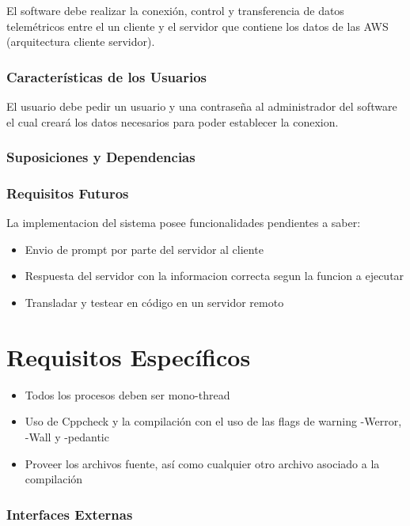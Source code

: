 \documentclass[10pt, a4paper,notitlepage]{article}
\begin{document}
El software debe realizar la conexión, control y transferencia de datos telemétricos entre el un cliente y el servidor que contiene los
datos de las AWS (arquitectura cliente servidor).
\subsubsection{Características de los Usuarios }
El usuario debe pedir un usuario y una contraseña al administrador del software el cual creará los datos necesarios para poder establecer la conexion.


\subsubsection{Suposiciones y Dependencias}

\subsubsection{Requisitos Futuros}
La implementacion del sistema posee funcionalidades pendientes a saber:
\begin{itemize}
	\item Envio de prompt por parte del servidor al cliente 
	\item Respuesta del servidor con la informacion correcta segun la funcion a ejecutar
	\item Transladar y testear en código en un servidor remoto 
	
\end{itemize}
\section{Requisitos Específicos}
\begin{itemize}
	\item Todos los procesos deben ser mono-thread
	\item Uso de Cppcheck y la compilación con el uso de las flags de warning -Werror, -Wall y -pedantic
	\item Proveer los archivos fuente, así como cualquier otro archivo asociado
	a la compilación
	
\end{itemize}

\subsubsection{Interfaces Externas}
\end{document}
